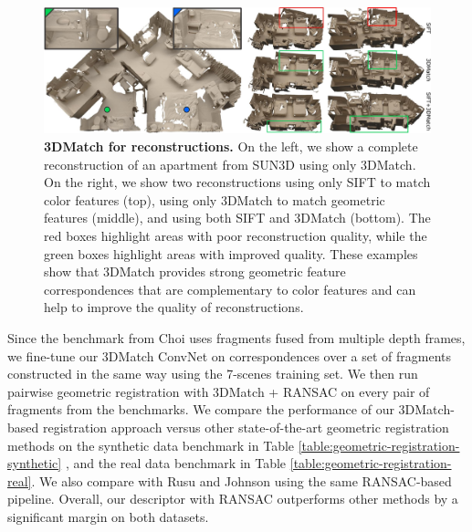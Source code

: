 \documentclass[10pt,twocolumn,letterpaper]{article}
\begin{document}
\begin{figure}[t]
\vspace{-4mm}
\centering
\includegraphics[width=1\linewidth]{images/scene-reconstruction.jpg}
\caption{{\bf 3DMatch for reconstructions.} On the left, we show a complete reconstruction of an apartment from SUN3D \cite{SUN3D} using only 3DMatch. On the right, we show two reconstructions using only SIFT to match color features (top), using only 3DMatch to match geometric features (middle), and using both SIFT and 3DMatch (bottom). The red boxes highlight areas with poor reconstruction quality, while the green boxes highlight areas with improved quality. These examples show that 3DMatch provides strong geometric feature correspondences that are complementary to color features and can help to improve the quality of reconstructions.}
\label{fig:scene-reconstruction}
\end{figure}

Since the benchmark from Choi \etal \cite{choi2015robust} uses fragments fused from multiple depth frames, we fine-tune our 3DMatch ConvNet on correspondences over a set of fragments constructed in the same way using the 7-scenes training set. We then run pairwise geometric registration with 3DMatch + RANSAC on every pair of fragments from the benchmarks. We compare the performance of our 3DMatch-based registration approach versus other state-of-the-art geometric registration methods on the synthetic data benchmark in Table \ref{table:geometric-registration-synthetic} \cite{choi2015robust}, and the real data benchmark in Table \ref{table:geometric-registration-real}. We also compare with Rusu \etal \cite{rusu2009fast} and Johnson \etal \cite{johnson1999using} using the same RANSAC-based pipeline. Overall, our descriptor with RANSAC outperforms other methods by a significant margin on both datasets.
\end{document}
